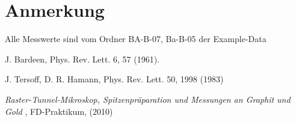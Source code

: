 \documentclass[
	a4paper,
	12pt,
	pagesize,
	ngerman
]{scrartcl}
\begin{document}
\section{Anmerkung}
Alle Messwerte sind vom Ordner BA-B-07, Ba-B-05 der Example-Data

\newpage
\begin{thebibliography}{9}
	J. Bardeen, Phys. Rev. Lett. 6, 57 (1961).
	
	J. Tersoff, D. R. Hamann, Phys. Rev. Lett. 50, 1998 (1983)
	
	\textit{Raster-Tunnel-Mikroskop, Spitzenpräparation und Messungen an Graphit und Gold },
	FD-Praktikum, (2010)

\end{thebibliography}
\end{document}
